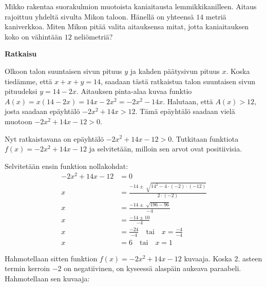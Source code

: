 \begin{esimerkki}
Mikko rakentaa suorakulmion muotoista kaniaitausta lemmikkikanilleen. Aitaus rajoittuu yhdeltä sivulta Mikon taloon. Hänellä on yhteensä $14$ metriä kaniverkkoa. Miten Mikon pitää valita aitauksensa mitat, jotta kaniaitauksen koko on vähintään $12$ neliömetriä?


\textbf{Ratkaisu}

Olkoon talon suuntaisen sivun pituus $y$ ja kahden päätysivun pituus $x$. Koska tiedämme, että $x+x+y=14$, saadaan tästä ratkaistua talon suuntaisen sivun pituudeksi $y=14 - 2x$.
Aitauksen pinta-alaa kuvaa funktio $A(x)=x(14-2x)=14x-2x^2=-2x^2-14x$. Halutaan, että $A(x)>12$, josta saadaan epäyhtälö $-2x^2+14x>12$. Tämä epäyhtälö saadaan vielä muotoon $-2x^2+14x-12>0$.

Nyt ratkaistavana on epäyhtälö $-2x^2+14x-12>0$. Tutkitaan funktiota $f(x)=-2x^2+14x-12$ ja selvitetään, milloin sen arvot ovat positiivisia.

Selvitetään ensin funktion nollakohdat:
\begin{align*}
-2x^2+14x-12&=0 \\
x&=\frac{-14 \pm \sqrt[]{14^2-4 \cdot (-2) \cdot (-12)}}{2 \cdot (-2)} \\
x&=\frac{-14 \pm \sqrt[]{196-96}}{-4} \\
x&=\frac{-14 \pm 10}{-4} \\
x&=\frac{-24}{-4} \quad \text{tai} \quad x=\frac{-4}{-4} \\
x&=6 \quad \text{tai} \quad x=1
\end{align*}

Hahmotellaan sitten funktion $f(x)=-2x^2+14x-12$ kuvaaja. Koska 2. asteen termin kerroin $-2$ on negatiivinen, on kyseessä alaspäin aukeava paraabeli. Hahmotellaan sen kuvaaja:

\begin{lukusuora}{-2.5}{2.5}{5}
\end{lukusuora}


\end{esimerkki}
